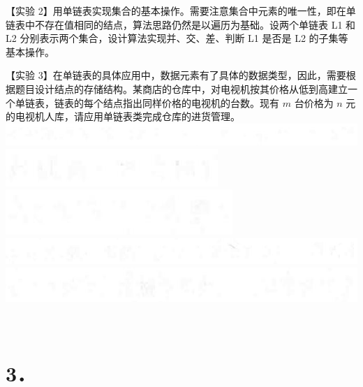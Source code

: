 \documentclass[10pt]{article}
\begin{document}
【实验 2】用单链表实现集合的基本操作。需要注意集合中元素的唯一性，即在单链表中不存在值相同的结点，算法思路仍然是以遍历为基础。设两个单链表 L1 和 L2 分别表示两个集合，设计算法实现并、交、差、判断 L1 是否是 L2 的子集等基本操作。

【实验 3】在单链表的具体应用中，数据元素有了具体的数据类型，因此，需要根据题目设计结点的存储结构。某商店的仓库中，对电视机按其价格从低到高建立一个单链表，链表的每个结点指出同样价格的电视机的台数。现有 $m$ 台价格为 $n$ 元的电视机人库，请应用单链表类完成仓库的进货管理。\\
\includegraphics[max width=\textwidth, center]{2025_06_06_704745ea57b15b2333e5g-081(1)}\\
\includegraphics[max width=\textwidth, center]{2025_06_06_704745ea57b15b2333e5g-081(2)}\\
\includegraphics[max width=\textwidth, center]{2025_06_06_704745ea57b15b2333e5g-081}\\
\includegraphics[max width=\textwidth, center]{2025_06_06_704745ea57b15b2333e5g-081(4)}\\
\includegraphics[max width=\textwidth, center]{2025_06_06_704745ea57b15b2333e5g-081(3)}\\
$\qquad$\\
$\qquad$

\section*{3．}
\end{document}
